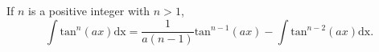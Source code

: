 If $n$ is a positive integer with $n>1$,
\[ \int \mathrm{tan}^{n}(ax)\mathrm{dx}
= \frac{1}{a(n-1)} \mathrm{tan}^{n-1}(ax) 
- \int \mathrm{tan}^{n-2}(ax) \mathrm{dx} . \]